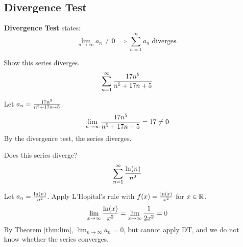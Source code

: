 \documentclass[english, 12pt]{article}
\begin{document}
\subsection{Divergence Test}
\begin{defn}[DT]
\textbf{Divergence Test} states:
\[ \lim_{n\to\infty} a_{n} \neq 0 \implies \sum_{n=1}^\infty a_{n} \text{ diverges.} \]
\end{defn}
\begin{exmp}
Show this series diverges.
\[ \sum_{n=1}^\infty \frac{17n^5}{n^5 + 17n + 5} \]
\begin{sol}
Let $a_{n} = \frac{17n^5}{n^5 + 17n + 5} $
\[\lim_{n\to\infty}\frac{17n^5}{n^5 + 17n + 5} = 17 \neq 0\]
By the divergence test, the series diverges.
\end{sol}
\end{exmp}
\begin{exmp}
Does this series diverge?
\[ \sum_{n=1}^\infty \frac{\ln(n)}{n^2}\]
\begin{sol}
Let $a_{n} = \frac{\ln(n)}{n^2}$. Apply L'Hopital's rule with $f(x) = \frac{\ln(x)}{x^2}$ for $x \in {\mathbb{R}}$.
\[\lim_{x \to\infty} \frac{\ln(x)}{x^2} = \lim_{x \to\infty} \frac{1}{2x^2} = 0\]
By Theorem \ref{thm:lim}, $\lim_{n\to\infty} a_{n} = 0$, but cannot apply DT, and we do not know whether the series converges.
\end{sol}
\end{exmp}
\end{document}
